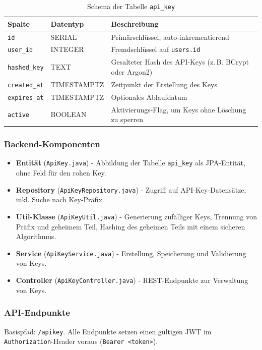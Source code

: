 \documentclass[12pt,a4paper]{report}
\begin{document}
    \begin{table}[!htbp]
    \centering
    \begin{tabular}{|l|l|p{9cm}|}
    \hline
    \textbf{Spalte} & \textbf{Datentyp} & \textbf{Beschreibung} \\
    \hline
    \texttt{id} & SERIAL & Primärschlüssel, auto-inkrementierend \\
    \texttt{user\_id} & INTEGER & Fremdschlüssel auf \texttt{users.id} \\
    \texttt{hashed\_key} & TEXT & Gesalteter Hash des API-Keys (z.\,B. BCrypt oder Argon2) \\
    \texttt{created\_at} & TIMESTAMPTZ & Zeitpunkt der Erstellung des Keys \\
    \texttt{expires\_at} & TIMESTAMPTZ & Optionales Ablaufdatum \\
    \texttt{active} & BOOLEAN & Aktivierungs-Flag, um Keys ohne Löschung zu sperren \\
    \hline
    \end{tabular}
    \caption{Schema der Tabelle \texttt{api\_key}}
    \label{tab:api_key_schema}
    \end{table}

    \subsubsection{Backend-Komponenten}
    \begin{itemize}
      \item \textbf{Entität} (\texttt{ApiKey.java}) - Abbildung der Tabelle \texttt{api\_key} als JPA-Entität, ohne Feld für den rohen Key.
      \item \textbf{Repository} (\texttt{ApiKeyRepository.java}) - Zugriff auf API-Key-Datensätze, inkl. Suche nach Key-Präfix.
      \item \textbf{Util-Klasse} (\texttt{ApiKeyUtil.java}) - Generierung zufälliger Keys, Trennung von Präfix und geheimem Teil, Hashing des geheimen Teils mit einem sicheren Algorithmus.
      \item \textbf{Service} (\texttt{ApiKeyService.java}) - Erstellung, Speicherung und Validierung von Keys.
      \item \textbf{Controller} (\texttt{ApiKeyController.java}) - REST-Endpunkte zur Verwaltung von Keys.
    \end{itemize}

    \subsubsection{API-Endpunkte}
    Basispfad: \texttt{/apikey}. Alle Endpunkte setzen einen gültigen JWT im \texttt{Authorization}-Header voraus (\texttt{Bearer <token>}).
\end{document}

